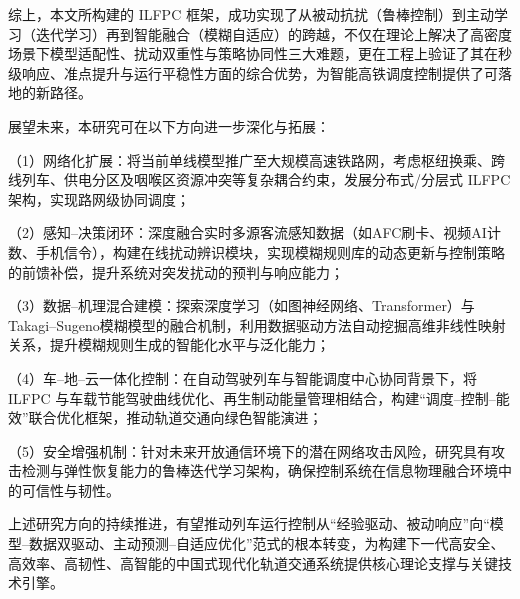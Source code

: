 综上，本文所构建的 ILFPC 框架，成功实现了从被动抗扰（鲁棒控制）到主动学习（迭代学习）再到智能融合（模糊自适应）的跨越，不仅在理论上解决了高密度场景下模型适配性、扰动双重性与策略协同性三大难题，更在工程上验证了其在秒级响应、准点提升与运行平稳性方面的综合优势，为智能高铁调度控制提供了可落地的新路径。

展望未来，本研究可在以下方向进一步深化与拓展：

（1）网络化扩展：将当前单线模型推广至大规模高速铁路网，考虑枢纽换乘、跨线列车、供电分区及咽喉区资源冲突等复杂耦合约束，发展分布式/分层式 ILFPC 架构，实现路网级协同调度；

（2）感知–决策闭环：深度融合实时多源客流感知数据（如AFC刷卡、视频AI计数、手机信令），构建在线扰动辨识模块，实现模糊规则库的动态更新与控制策略的前馈补偿，提升系统对突发扰动的预判与响应能力；

（3）数据–机理混合建模：探索深度学习（如图神经网络、Transformer）与Takagi–Sugeno模糊模型的融合机制，利用数据驱动方法自动挖掘高维非线性映射关系，提升模糊规则生成的智能化水平与泛化能力；

（4）车–地–云一体化控制：在自动驾驶列车与智能调度中心协同背景下，将 ILFPC 与车载节能驾驶曲线优化、再生制动能量管理相结合，构建“调度–控制–能效”联合优化框架，推动轨道交通向绿色智能演进；

（5）安全增强机制：针对未来开放通信环境下的潜在网络攻击风险，研究具有攻击检测与弹性恢复能力的鲁棒迭代学习架构，确保控制系统在信息物理融合环境中的可信性与韧性。

上述研究方向的持续推进，有望推动列车运行控制从“经验驱动、被动响应”向“模型–数据双驱动、主动预测–自适应优化”范式的根本转变，为构建下一代高安全、高效率、高韧性、高智能的中国式现代化轨道交通系统提供核心理论支撑与关键技术引擎。
